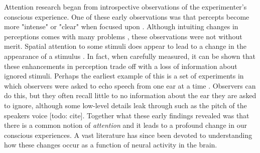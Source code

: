 Attention research began from introspective observations of the experimenter's conscious experience. One of these early observations was that percepts become more "intense" or "clear" when focused upon \citep{Helmholtz1924-rl,James1981-cj,Kuelpe1902-qz,Titchener1908-bx}. Although intuiting changes in perceptions comes with many problems \citep{Helmholtz1924-rl}, these observations were not without merit. Spatial attention to some stimuli does appear to lead to a change in the appearance of a stimulus \citep{Carrasco2018-sb}. In fact, when carefully measured, it can be shown that these enhancements in perception trade off with a loss of information about ignored stimuli. Perhaps the earliest example of this is a set of experiments in which observers were asked to echo speech from one ear at a time \citep{Cherry1953-as}. Observers can do this, but they often recall little to no information about the ear they are asked to ignore, although some low-level details leak through such as the pitch of the speakers voice [todo: cite]. Together what these early findings revealed was that there is a common notion of \textit{attention} and it leads to a profound change in our conscious experiences. A vast literature has since been devoted to understanding how these changes occur as a function of neural activity in the brain. 

